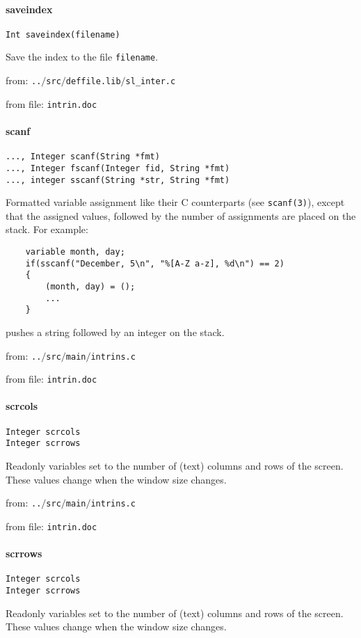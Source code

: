 \paragraph{saveindex}
\begin{verbatim}
Int saveindex(filename)
\end{verbatim}
Save the index to the file {\tt filename}.


from: {\tt ..$/$src$/$deffile.lib$/$sl\_inter.c}

from file: {\tt intrin.doc}


\paragraph{scanf}
\begin{verbatim}
..., Integer scanf(String *fmt)
..., Integer fscanf(Integer fid, String *fmt)
..., integer sscanf(String *str, String *fmt)
\end{verbatim}
Formatted variable assignment like their C counterparts
(see {\tt scanf(3)}), except that the assigned values, followed
by the number of assignments are placed on the stack. For
example:
\begin{verbatim}
    variable month, day;
    if(sscanf("December, 5\n", "%[A-Z a-z], %d\n") == 2)
    {
        (month, day) = ();
        ...
    }
\end{verbatim}
pushes a string followed by an integer on the stack.


from: {\tt ..$/$src$/$main$/$intrins.c}

from file: {\tt intrin.doc}


\paragraph{scrcols}
\begin{verbatim}
Integer scrcols
Integer scrrows
\end{verbatim}
Readonly variables set to the number of (text) columns and
rows of the screen. These values change when the window
size changes.


from: {\tt ..$/$src$/$main$/$intrins.c}

from file: {\tt intrin.doc}


\paragraph{scrrows}
\begin{verbatim}
Integer scrcols
Integer scrrows
\end{verbatim}
Readonly variables set to the number of (text) columns and
rows of the screen. These values change when the window
size changes.


